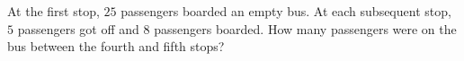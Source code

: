 At the first stop, $25$ passengers boarded an empty bus. At each subsequent stop, $5$ passengers got off and $8$ passengers boarded. How many passengers were on the bus between the fourth and fifth stops?
